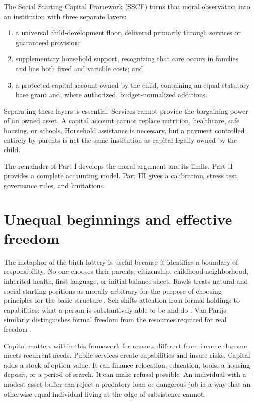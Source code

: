 \documentclass[11pt]{article}
\begin{document}
The Social Starting Capital Framework (SSCF) turns that moral observation into an
institution with three separate layers:

\begin{enumerate}[label=\arabic*.]
  \item a universal child-development floor, delivered primarily through services or
  guaranteed provision;
  \item supplementary household support, recognizing that care occurs in families and
  has both fixed and variable costs; and
  \item a protected capital account owned by the child, containing an equal statutory
  base grant and, where authorized, budget-normalized additions.
\end{enumerate}

Separating these layers is essential. Services cannot provide the bargaining power of
an owned asset. A capital account cannot replace nutrition, healthcare, safe housing,
or schools. Household assistance is necessary, but a payment controlled entirely by
parents is not the same institution as capital legally owned by the child.

The remainder of Part I develops the moral argument and its limits. Part II provides a
complete accounting model. Part III gives a calibration, stress test, governance rules,
and limitations.

\section{Unequal beginnings and effective freedom}

The metaphor of the birth lottery is useful because it identifies a boundary of
responsibility. No one chooses their parents, citizenship, childhood neighborhood,
inherited health, first language, or initial balance sheet. Rawls treats natural and
social starting positions as morally arbitrary for the purpose of choosing principles
for the basic structure \cite{rawls1971}. Sen shifts attention from formal holdings to
capabilities: what a person is substantively able to be and do \cite{sen1999}. Van
Parijs similarly distinguishes formal freedom from the resources required for real
freedom \cite{vanparijs1995}.

Capital matters within this framework for reasons different from income. Income meets
recurrent needs. Public services create capabilities and insure risks. Capital adds a
stock of option value. It can finance relocation, education, tools, a housing deposit,
or a period of search. It can make refusal possible. An individual with a modest asset
buffer can reject a predatory loan or dangerous job in a way that an otherwise equal
individual living at the edge of subsistence cannot.
\end{document}
